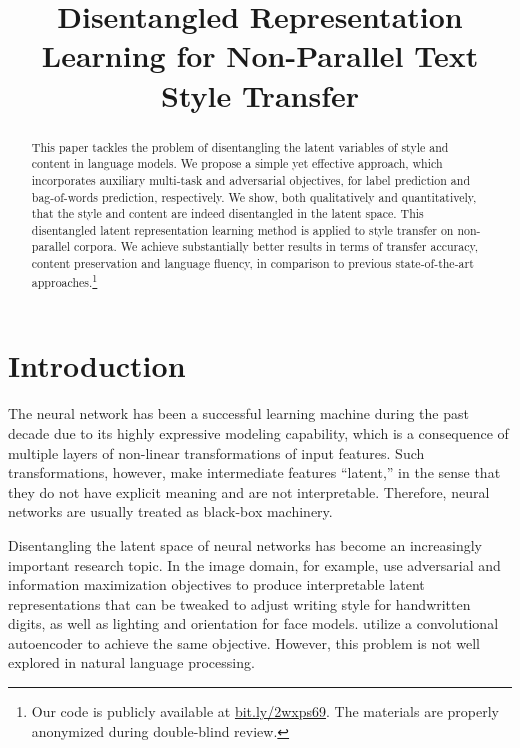 \documentclass[letterpaper]{article} %
\title{Disentangled Representation Learning for Non-Parallel Text Style Transfer}
\date{}
\newcommand{\citeay}[1]{\citeauthor{#1} \shortcite{#1}}
\begin{document}
\maketitle
\graphicspath{{images/}}

\begin{abstract}
	This paper tackles the problem of disentangling the latent variables of style and content in language models.
	We propose a simple yet effective approach, which incorporates auxiliary multi-task and adversarial objectives, for label prediction and bag-of-words prediction, respectively.
	We show, both qualitatively and quantitatively, that the style and content are indeed disentangled in the latent space.
	This disentangled latent representation learning method is applied to style transfer on non-parallel corpora.
	We achieve substantially better results in terms of transfer accuracy, content preservation and language fluency, in comparison to previous state-of-the-art approaches.\footnote{Our code is publicly available at \url{bit.ly/2wxps69}. The materials are properly anonymized during double-blind review.}
\end{abstract}

% 


\section{Introduction}

The neural network has been a successful learning machine during the past decade due to its highly expressive modeling capability, which is a consequence of multiple layers of non-linear transformations of input features.
Such transformations, however, make intermediate features ``latent,'' in the sense that they do not have explicit meaning and are not interpretable.
Therefore, neural networks are usually treated as black-box machinery.

Disentangling the latent space of neural networks has become an increasingly important research topic.
In the image domain, for example, \citeay{chen2016infogan} use adversarial and information maximization objectives to produce interpretable latent representations that can be tweaked to adjust writing style for handwritten digits, as well as lighting and orientation for face models.
\citeay{mathieu2016disentangling} utilize a convolutional autoencoder to achieve the same objective.
However, this problem is not well explored in natural language processing.
\end{document}
